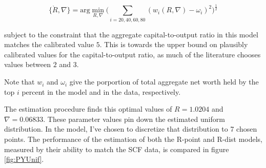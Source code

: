 $$ \{\grave{R}, \nabla\} = \text{arg}\min_{R, \nabla} \bigg( \sum_{i=20, 40, 60, 80} (w_{i}(R, \nabla)-\omega_i )^{2} \bigg)^{\frac{1}{2}} $$

\par subject to the constraint that the aggregate capital-to-output ratio in this model matches the calibrated value $5$. This is towards the upper bound on plausibly calibrated values for the capital-to-output ratio, as much of the literature chooses values between $2$ and  $3$.

\par Note that $w_i$ and $\omega_i$ give the porportion of total aggregate net worth held by the top $i$ percent in the model and in the data, respectively.

\par The estimation procedure finds this optimal values of $R = 1.0204$ and $\nabla = 0.06833$. These parameter values pin down the estimated uniform distribution. In the model, I've chosen to discretize that distribution to 7 chosen points. The performance of the estimation of both the R-point and R-dist models, measured by their ability to match the SCF data, is compared in figure \ref{fig:PYUnif}.

